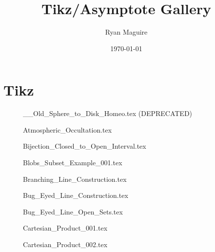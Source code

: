 \documentclass{article}
\title{Tikz/Asymptote Gallery}
\author{Ryan Maguire}
\date{\today}
\begin{document}
    \maketitle
    \tableofcontents
    \listoffigures
    \newpage
    \section{Tikz}
        \begin{figure}[H]
            \centering
            
            \caption{\_\_Old\_Sphere\_to\_Disk\_Homeo.tex (DEPRECATED)}
        \end{figure}
        \begin{figure}[H]
            \centering
            
            \caption{Atmospheric\_Occultation.tex}
        \end{figure}
        \begin{figure}[H]
            \centering
            
            \caption{Bijection\_Closed\_to\_Open\_Interval.tex}
        \end{figure}
        \begin{figure}[H]
            \centering
            
            \caption{Blobs\_Subset\_Example\_001.tex}
        \end{figure}
        \begin{figure}[H]
            \centering
            
            \caption{Branching\_Line\_Construction.tex}
        \end{figure}
        \begin{figure}[H]
            \centering
            
            \caption{Bug\_Eyed\_Line\_Construction.tex}
        \end{figure}
        \begin{figure}[H]
            \centering
            
            \caption{Bug\_Eyed\_Line\_Open\_Sets.tex}
        \end{figure}
        \begin{figure}[H]
            \centering
            
            \caption{Cartesian\_Product\_001.tex}
        \end{figure}
        \begin{figure}[H]
            \centering
            
            \caption{Cartesian\_Product\_002.tex}
        \end{figure}
\end{document}
